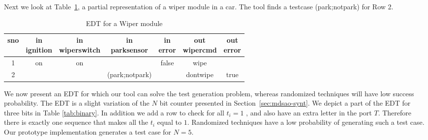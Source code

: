 %
%  
Next we look at Table~\ref{tab:wiper}, a partial representation of a wiper module in a car. The tool finds a testcase (park;notpark) for Row 2.

\begin{table}[h!]
  \centering {}
  \caption{EDT for a Wiper module}
  \label{tab:wiper}
  \begin{tabular}{|c|c|c|c|c||c|c|}
    \hline
    sno & \specialcell{in \\ ignition} &
                                         \specialcell{in \\ wiperswitch} & 
                                                                       \specialcell{in 
    \\ parksensor} & \specialcell{in \\ error} & \specialcell{out \\ wipercmd} & 
                                             \specialcell{out \\ error} \\
    \hline 
    1 & on & on & 
    & false & wipe &
    \\
    \hline

    2 & & & (park;notpark) & & dontwipe & true \\
    \hline
  \end{tabular}
  
\end{table}


We now present an EDT for which our tool can solve the test generation problem, whereas randomized techniques will have low success probability. %
The EDT is a slight variation of the $N$ bit counter presented in Section~\ref{sec:mdsao-synt}. We depict a part of the EDT for three bits in
Table \ref{tab:binary}. %
In addition we add a row to check for all $t_i = 1$ , and also have an extra letter in the port $T$. Therefore there is exactly one sequence that makes all the $t_i$ equal to $1$. Randomized techniques have a low probability of generating such a test case. 
Our prototype implementation generates a test case for $N=5$. 

